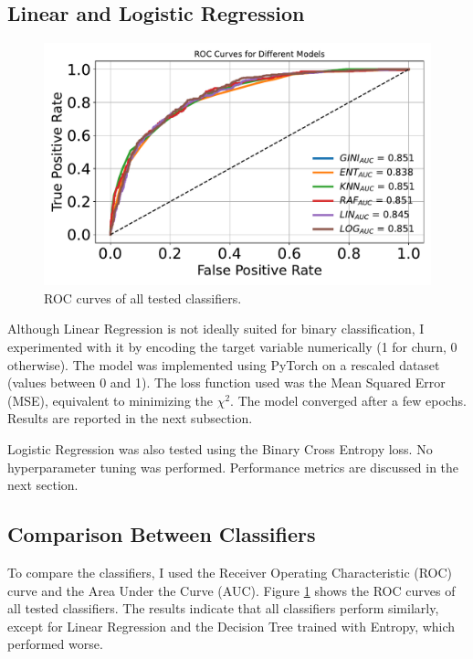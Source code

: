 \documentclass[a4paper,11pt]{article}
\begin{document}
\subsection{Linear and Logistic Regression}
\begin{figure}
    \begin{center}    
    \includegraphics[width=\linewidth]{figures/classification/roc_curves.pdf}
        \end{center}
    \caption{ROC curves of all tested classifiers.}
    \label{fig:roc}
\end{figure}
Although Linear Regression is not ideally suited for binary classification, I experimented with it by encoding the target variable numerically (1 for churn, 0 otherwise). The model was implemented using PyTorch on a rescaled dataset (values between 0 and 1). The loss function used was the Mean Squared Error (MSE), equivalent to minimizing the $\chi^2$. The model converged after a few epochs. Results are reported in the next subsection.

Logistic Regression was also tested using the Binary Cross Entropy loss. No hyperparameter tuning was performed. Performance metrics are discussed in the next section.

\subsection{Comparison Between Classifiers}

To compare the classifiers, I used the Receiver Operating Characteristic (ROC) curve and the Area Under the Curve (AUC). Figure \ref{fig:roc} shows the ROC curves of all tested classifiers. The results indicate that all classifiers perform similarly, except for Linear Regression and the Decision Tree trained with Entropy, which performed worse.
\end{document}
